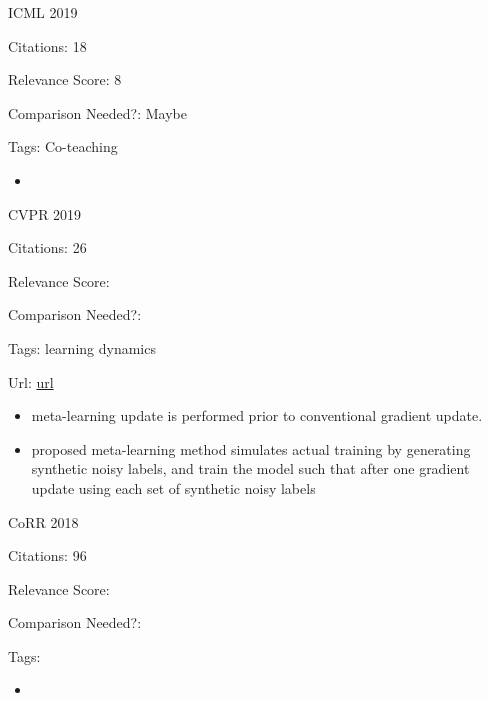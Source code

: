\documentclass[11pt]{article}
\begin{document}
\vspace{2cm}

\noindent ICML 2019

\noindent Citations: 18

\noindent Relevance Score: 8

\noindent Comparison Needed?: Maybe

\noindent Tags: Co-teaching

\begin{itemize}
\item 
\end{itemize}

\vspace{2cm}

\noindent CVPR 2019

\noindent Citations: 26

\noindent Relevance Score:

\noindent Comparison Needed?: 

\noindent Tags: learning dynamics

\noindent Url: \href{https://arxiv.org/pdf/1812.05214.pdf}{url}

\begin{itemize}
  \item meta-learning update is performed prior to conventional gradient update.
  \item proposed meta-learning method simulates actual training by generating synthetic noisy labels, and train the model such that after one gradient update using each set of synthetic noisy labels
\end{itemize}



\vspace{2cm}

\noindent CoRR 2018

\noindent Citations: 96

\noindent Relevance Score:

\noindent Comparison Needed?: 

\noindent Tags: 

\begin{itemize}
  \item 
\end{itemize}

\vspace{2cm}
\end{document}
